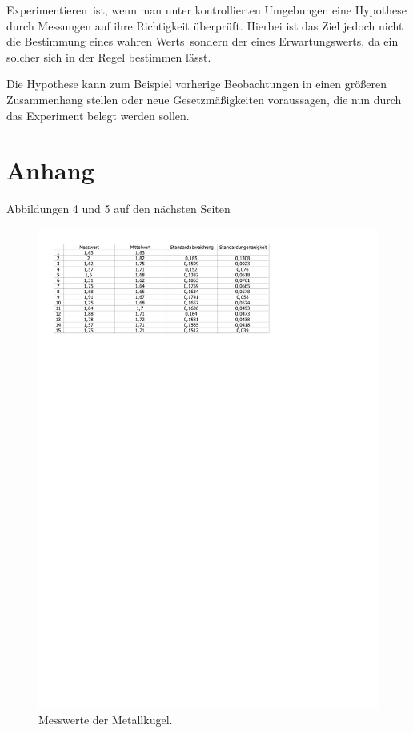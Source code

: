 \documentclass[11pt,a4paper,titlepage, ngerman]{article}
\begin{document}
		\glqq Experimentieren\grqq\ ist, wenn man unter kontrollierten Umgebungen eine Hypothese durch Messungen auf ihre Richtigkeit überprüft.
		Hierbei ist das Ziel jedoch nicht die Bestimmung eines \glqq wahren Werts\grqq\, sondern der eines Erwartungswerts, da ein solcher sich in der Regel bestimmen lässt.
	
		Die Hypothese kann zum Beispiel vorherige Beobachtungen in einen größeren Zusammenhang stellen oder neue Gesetzmäßigkeiten voraussagen, die nun durch das Experiment belegt werden sollen.
		
		\newpage
	\section{Anhang}
		\label{Anhang}
		Abbildungen 4 und 5 auf den nächsten Seiten
		\begin{figure}
			\includegraphics[scale=0.68]{Metallkugel.pdf}
			\caption{Messwerte der Metallkugel.}
		\end{figure}
\end{document}
